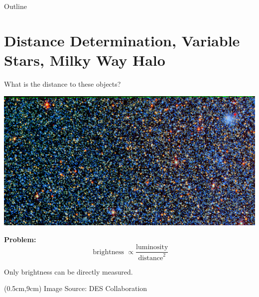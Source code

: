 \documentclass[12pt]{beamer}
\newcommand{\foot}[1]{\begin{textblock*}{12cm}(0.5cm,9cm) %
  {\tiny #1}
      \end{textblock*}}
\begin{document}
\begin{frame}{Outline}
  \tableofcontents
  \end{frame}









\section{Distance Determination, Variable Stars, Milky Way Halo}

\begin{frame}{What is the distance to these objects?}

  \begin{center}
    \includegraphics[scale=0.5]{figs/des_small.png}\\
  \end{center}
  \textbf{Problem:}
  \begin{equation*}
    \text{ brightness } \propto \frac{\text{luminosity}}{\text{distance}^2}
  \end{equation*}
\begin{center}
  Only brightness can be directly measured.
  \end{center}

\foot{Image Source: DES Collaboration}
\end{frame}
\end{document}

